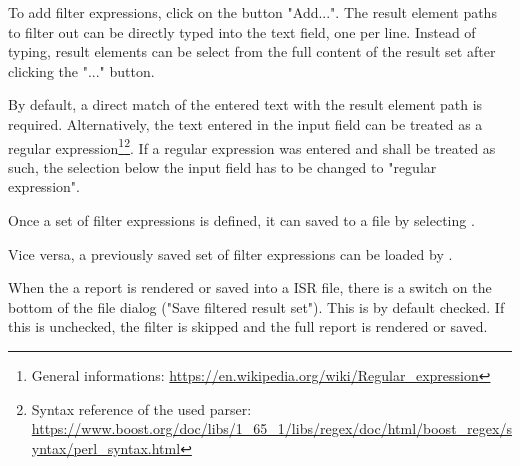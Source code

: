 To add filter expressions, click on the button "Add...".
The result element paths to filter out can be directly typed into the text field, one per line.
Instead of typing, result elements can be select from the full content of the result set after clicking the "..." button.

By default, a direct match of the entered text with the result element path is required.
Alternatively, the text entered in the input field can be treated as a regular expression\footnote{General informations: \url{https://en.wikipedia.org/wiki/Regular_expression}}\footnote{Syntax reference of the used parser:\\\url{https://www.boost.org/doc/libs/1_65_1/libs/regex/doc/html/boost_regex/syntax/perl_syntax.html}}.
If a regular expression was entered and shall be treated as such, the selection below the input field has to be changed to "regular expression".

Once a set of filter expressions is defined, it can saved to a file by selecting .

Vice versa, a previously saved set of filter expressions can be loaded by .

When the a report is rendered or saved into a ISR file, there is a switch on the bottom of the file dialog ("Save filtered result set").
This is by default checked.
If this is unchecked, the filter is skipped and the full report is rendered or saved.